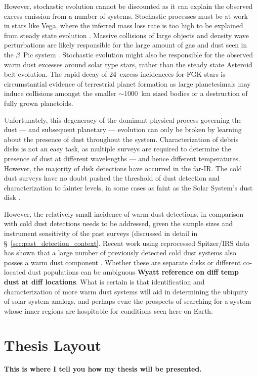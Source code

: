     However, stochastic evolution cannot be discounted as it can explain the observed excess emission from a number of systems. Stochastic processes must be at work in stars like Vega, where the inferred mass loss rate is too high to be explained from steady state evolution \citep{Su2006}. Massive collisions of large objects and density wave perturbations are likely responsible for the large amount of gas and dust seen in the $\beta$~Pic system \citep{Telesco2005, Nesvold2015}. Stochastic  evolution might also be responsible for the observed warm dust excesses around solar type stars, rather than the steady state Asteroid belt evolution. The rapid decay of 24\micron\ excess incidencees for FGK stars is circumstantial evidence of terrestrial planet formation as large planetesimals may induce collisions amongst the smaller $\sim$1000~km sized bodies or a destruction of fully grown planetoids\citep{Meyer2008, Wyatt2008}. 
    
    
    Unfortunately, this degeneracy of the dominant physical process governing the dust --- and subsequent planetary --- evolution can only be broken by learning about the presence of dust throughout the system. Characterization of debris disks is not an easy task, as multiple surveys are required to determine the presence of dust at different wavelengths --- and hence different temperatures. However, the majority of disk detections have occurred in the far-IR. The cold dust surveys have no doubt pushed the threshold of dust detection and characterization to fainter levels, in some cases as faint as the Solar System's dust disk \citep{Matthews2013}. 
    
    However, the relatively small incidence of warm dust detections, in comparison with cold dust detections needs to be addressed, given the sample sizes and instrument sensitivity of the past surveys (discussed in detail in \S~\ref{sec:past_detection_context}. Recent work using reprocessed Spitzer/IRS data has shown that a large number of previously detected cold dust systems also posses a warm dust component \citep{Chen2014}. Whether these are separate disks or different co-located dust populations can be ambiguous \textbf{Wyatt reference on diff temp dust at diff locations}. What is certain is that identification and characterization of more warm dust systems will aid in determining the ubiquity of solar system analogs, and perhaps evne the prospects of searching for a system whose inner regions are hospitable for conditions seen here on Earth. 
    
    
\section{Thesis Layout}
    
    \textbf{This is where I tell you how my thesis will be presented.}
    

    